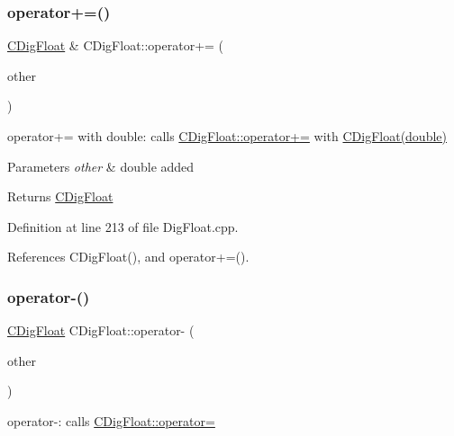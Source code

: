 \subsubsection{\texorpdfstring{operator+=()}{operator+=()}\hspace{0.1cm}{\footnotesize\ttfamily [2/2]}}
{\footnotesize\ttfamily \hyperlink{classCDigFloat}{C\+Dig\+Float} \& C\+Dig\+Float\+::operator+= (\begin{DoxyParamCaption}\item[{const double}]{other }\end{DoxyParamCaption})}



operator+= with double\+: calls \hyperlink{classCDigFloat_a84b2ad9b4d1a75aae261074ed7c6fefe}{C\+Dig\+Float\+::operator+=} with \hyperlink{classCDigFloat_a0ae24452dfb7838ec97a3998cd2b8f36}{C\+Dig\+Float(double)} 


\begin{DoxyParams}{Parameters}
{\em other} & double added \\
\hline
\end{DoxyParams}
\begin{DoxyReturn}{Returns}
\hyperlink{classCDigFloat}{C\+Dig\+Float} 
\end{DoxyReturn}


Definition at line 213 of file Dig\+Float.\+cpp.



References C\+Dig\+Float(), and operator+=().

\mbox{\label{classCDigFloat_a8f94e4b416b59090743e59cb9423dbca}} 
\subsubsection{\texorpdfstring{operator-\/()}{operator-()}\hspace{0.1cm}{\footnotesize\ttfamily [1/2]}}
{\footnotesize\ttfamily \hyperlink{classCDigFloat}{C\+Dig\+Float} C\+Dig\+Float\+::operator-\/ (\begin{DoxyParamCaption}\item[{const \hyperlink{classCDigFloat}{C\+Dig\+Float} \&}]{other }\end{DoxyParamCaption})}



operator-\/\+: calls \hyperlink{classCDigFloat_a74f36566c2c79d7258b7b2dee35d46b2}{C\+Dig\+Float\+::operator=} 


